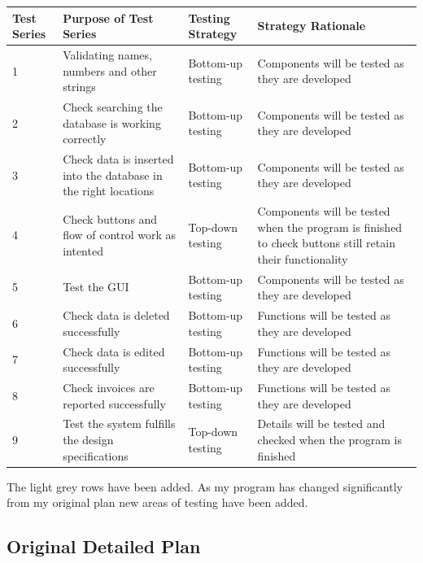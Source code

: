 \begin{landscape}
\begin{center}
	\begin{longtable}{|p{2cm}|p{3cm}|p{3cm}|p{3cm}|}
		\hline
		\textbf{Test Series}   & \textbf{Purpose of Test Series}   & \textbf{Testing Strategy}   & \textbf{Strategy Rationale} \\ \hline
		1 & Validating names, numbers and other strings  & Bottom-up testing  & Components will be tested as they are developed \\ \hline
		2 & Check searching the database is working correctly & Bottom-up testing  & Components will be tested as they are developed \\ \hline
		3 & Check data is inserted into the database in the right locations & Bottom-up testing  & Components will be tested as they are developed \\ \hline
		4 & Check buttons and flow of control work as intented & Top-down testing  & Components will be tested when the program is finished to check buttons still retain their functionality \\ \hline
		5 & Test the GUI & Bottom-up testing  & Components will be tested as they are developed \\ \hline
		\rowcolor{lightgrey} 6 & Check data is deleted successfully & Bottom-up testing & Functions will be tested as they are developed \\ \hline
		\rowcolor{lightgrey} 7 & Check data is edited successfully & Bottom-up testing & Functions will be tested as they are developed \\ \hline
		\rowcolor{lightgrey} 8 & Check invoices are reported successfully & Bottom-up testing & Functions will be tested as they are developed \\ \hline
		\rowcolor{lightgrey} 9 & Test the system fulfills the design specifications & Top-down testing & Details will be tested and checked when the program is finished \\ \hline
	\end{longtable}
\end{center}

The light grey rows have been added. As my program has changed significantly from my original plan new areas of testing have been added.

\subsection{Original Detailed Plan}


\end{landscape}
